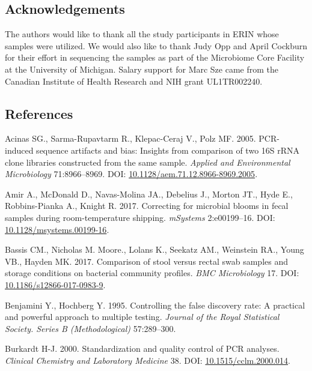 \documentclass[12pt,]{article}
\begin{document}
\newpage

\subsection{Acknowledgements}\label{acknowledgements}

The authors would like to thank all the study participants in ERIN whose
samples were utilized. We would also like to thank Judy Opp and April
Cockburn for their effort in sequencing the samples as part of the
Microbiome Core Facility at the University of Michigan. Salary support
for Marc Sze came from the Canadian Institute of Health Research and NIH
grant UL1TR002240.

\newpage

\subsection{References}\label{references}

\hypertarget{refs}{}
\hypertarget{ref-Acinas2005}{}
Acinas SG., Sarma-Rupavtarm R., Klepac-Ceraj V., Polz MF. 2005.
PCR-induced sequence artifacts and bias: Insights from comparison of two
16S rRNA clone libraries constructed from the same sample. \emph{Applied
and Environmental Microbiology} 71:8966--8969. DOI:
\href{https://doi.org/10.1128/aem.71.12.8966-8969.2005}{10.1128/aem.71.12.8966-8969.2005}.

\hypertarget{ref-Amir2017}{}
Amir A., McDonald D., Navas-Molina JA., Debelius J., Morton JT., Hyde
E., Robbins-Pianka A., Knight R. 2017. Correcting for microbial blooms
in fecal samples during room-temperature shipping. \emph{mSystems}
2:e00199--16. DOI:
\href{https://doi.org/10.1128/msystems.00199-16}{10.1128/msystems.00199-16}.

\hypertarget{ref-storage_Bassis_2017}{}
Bassis CM., Nicholas M. Moore., Lolans K., Seekatz AM., Weinstein RA.,
Young VB., Hayden MK. 2017. Comparison of stool versus rectal swab
samples and storage conditions on bacterial community profiles.
\emph{BMC Microbiology} 17. DOI:
\href{https://doi.org/10.1186/s12866-017-0983-9}{10.1186/s12866-017-0983-9}.

\hypertarget{ref-benjamini_controlling_1995}{}
Benjamini Y., Hochberg Y. 1995. Controlling the false discovery rate: A
practical and powerful approach to multiple testing. \emph{Journal of
the Royal Statistical Society. Series B (Methodological)} 57:289--300.

\hypertarget{ref-Burkardt2000}{}
Burkardt H-J. 2000. Standardization and quality control of PCR analyses.
\emph{Clinical Chemistry and Laboratory Medicine} 38. DOI:
\href{https://doi.org/10.1515/cclm.2000.014}{10.1515/cclm.2000.014}.
\end{document}
